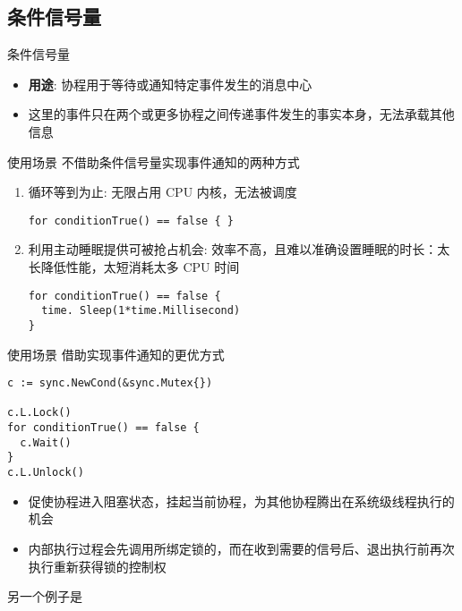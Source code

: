 \subsection{条件信号量\Cond}
\begin{frame}{条件信号量\Cond}
    \begin{itemize}
        \item \textbf{用途}: 协程用于等待或通知特定事件发生的\alert{消息中心}
        \item 这里的事件只在两个或更多协程之间传递事件发生的事实本身，\alert{无法承载其他信息}
    \end{itemize}
\end{frame}

\begin{frame}[fragile]{使用场景}
   不借助条件信号量实现事件通知的两种方式
   
   \begin{enumerate}
       \item {}循环等到为止: 无限占用 CPU 内核，\alert{无法被调度}
\begin{lstlisting}
for conditionTrue() == false { }    
\end{lstlisting}
       \item 利用主动睡眠提供可被抢占机会: \alert{效率不高，且难以准确设置睡眠的时长}：太长降低性能，太短消耗太多 CPU 时间    
\begin{lstlisting}
for conditionTrue() == false {
  time. Sleep(1*time.Millisecond)
}
\end{lstlisting}
   \end{enumerate}
\end{frame}

\begin{frame}[fragile]{使用场景}
   借助\Cond 实现事件通知的更优方式
\begin{lstlisting}
c := sync.NewCond(&sync.Mutex{})

c.L.Lock()
for conditionTrue() == false {
  c.Wait()
}
c.L.Unlock()
\end{lstlisting}

\begin{itemize}
    \item {}促使协程进入阻塞状态，挂起当前协程，为其他协程腾出在系统级线程执行的机会
    \item {}内部执行过程会先调用所绑定锁的，而在收到需要的信号后、退出执行前再次执行重新获得锁的控制权
\end{itemize}

另一个例子是
\end{frame}

